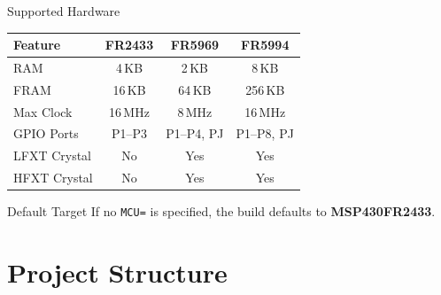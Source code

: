 \documentclass[aspectratio=169, 10pt]{beamer}
\begin{document}
\begin{frame}{Supported Hardware}
\begin{table}
\centering
\small
\begin{tabular}{@{}lccc@{}}
\toprule
\textbf{Feature} & \textbf{FR2433} & \textbf{FR5969} & \textbf{FR5994} \\
\midrule
RAM              & 4\,KB   & 2\,KB   & 8\,KB    \\
FRAM             & 16\,KB  & 64\,KB  & 256\,KB  \\
Max Clock        & 16\,MHz & 8\,MHz  & 16\,MHz  \\
GPIO Ports       & P1--P3  & P1--P4, PJ & P1--P8, PJ \\
LFXT Crystal     & No      & Yes     & Yes      \\
HFXT Crystal     & No      & Yes     & Yes      \\
\bottomrule
\end{tabular}
\end{table}

\vspace{0.3em}
\begin{alertblock}{Default Target}
If no \texttt{MCU=} is specified, the build defaults to \textbf{MSP430FR2433}.
\end{alertblock}
\end{frame}

\section{Project Structure}
\end{document}
